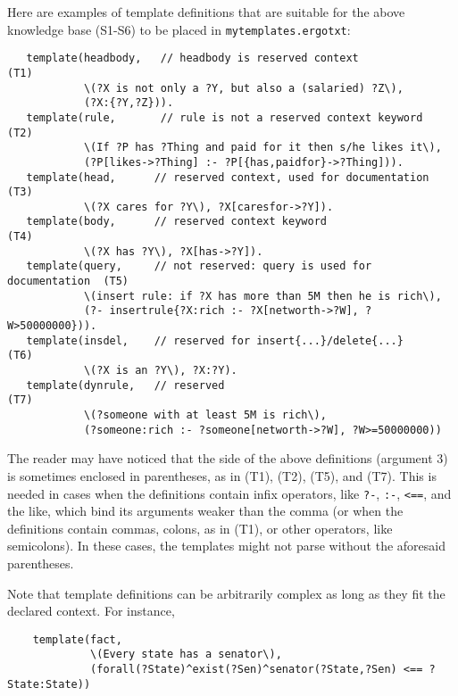Here are examples of template definitions that are suitable for the above
knowledge base (S1-S6) to be placed in \texttt{mytemplates.ergotxt}:
\begin{verbatim}
   template(headbody,   // headbody is reserved context                  (T1)
            \(?X is not only a ?Y, but also a (salaried) ?Z\),
            (?X:{?Y,?Z})).
   template(rule,       // rule is not a reserved context keyword        (T2)
            \(If ?P has ?Thing and paid for it then s/he likes it\),
            (?P[likes->?Thing] :- ?P[{has,paidfor}->?Thing])).
   template(head,      // reserved context, used for documentation       (T3)
            \(?X cares for ?Y\), ?X[caresfor->?Y]).
   template(body,      // reserved context keyword                       (T4)
            \(?X has ?Y\), ?X[has->?Y]).
   template(query,     // not reserved: query is used for documentation  (T5)
            \(insert rule: if ?X has more than 5M then he is rich\),
            (?- insertrule{?X:rich :- ?X[networth->?W], ?W>50000000})).
   template(insdel,    // reserved for insert{...}/delete{...}           (T6)
            \(?X is an ?Y\), ?X:?Y).
   template(dynrule,   // reserved                                       (T7)
            \(?someone with at least 5M is rich\),
            (?someone:rich :- ?someone[networth->?W], ?W>=50000000))
\end{verbatim}
The reader may have noticed that
the \FLSYSTEM side of the above definitions (argument 3) is
sometimes enclosed in parentheses, as in (T1), (T2), (T5), and (T7). This is
needed in cases when the definitions contain infix operators, like
\texttt{?-}, \texttt{:-}, \texttt{<==}, and the like, which bind its
arguments weaker than the comma (or when the definitions contain commas,
colons, as in (T1), or other operators, like
semicolons). In these cases, the templates might not parse
without the aforesaid parentheses.

Note that template definitions can be arbitrarily complex as long as they
fit the declared context. For instance,
\begin{verbatim}
    template(fact,
             \(Every state has a senator\),
             (forall(?State)^exist(?Sen)^senator(?State,?Sen) <== ?State:State))
\end{verbatim}


